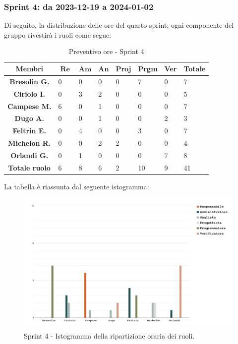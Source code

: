 \documentclass[10pt, a4paper]{article}
\begin{document}
{{{{{{{{{{{\subsubsection{Sprint 4: da 2023-12-19 a 2024-01-02}
Di seguito, la distribuzione delle ore del quarto sprint; ogni componente del gruppo rivestirà i ruoli come segue:
\begin{table}[H]
    \begin{tabularx}{\textwidth}{c|X|X|X|X|X|X|X}
        \textbf{Membri} & $\operatorname{\textbf{Re}}$ & $\mathrm{\textbf{Am}}$ & \textbf{An} & \textbf{Proj} & \textbf{Prgm} & \textbf{Ver} & \textbf{Totale} \\
        \hline
        \textbf{Bresolin G.} & 0 & 0 & 0 & 0 & \cellcolor{primarycolor}7 & 0 & 7 \\
        \hline
        \textbf{Ciriolo I.}  & 0 & 3 & \cellcolor{primarycolor}2 & 0 & 0 & 0 & 5 \\
        \hline
        \textbf{Campese M.}  & \cellcolor{primarycolor}6 & 0 & 1 & 0 & 0 & 0 & 7 \\
        \hline
        \textbf{Dugo A.}     & 0 & 0 &\cellcolor{primarycolor}1 & 0 & 0 & 2 & 3 \\
        \hline
        \textbf{Feltrin E.}  & 0 & \cellcolor{primarycolor}4 & 0 & 0 & 3 & 0 & 7 \\
        \hline
        \textbf{Michelon R.} & 0 & 0 & \cellcolor{primarycolor}2 & 2 & 0 & 0 & 4 \\
        \hline
        \textbf{Orlandi G.}  & 0 & 1 & 0 & 0 & 0 & \cellcolor{primarycolor}7 & 8 \\
        \hline
        \textbf{Totale ruolo} & 6 & 8 & 6 & 2 & 10 & 9 & 41 \\
    \end{tabularx}
    \caption{Preventivo ore - Sprint 4}
\end{table}

La tabella è riassunta dal seguente istogramma:
 \begin{figure}[H]
        \centering        
        \includegraphics[width=15.5cm]{istogrammi/istogramma_4_periodo.png}
        \caption{Sprint 4 - Istogramma della ripartizione oraria dei ruoli. }
    \end{figure}

}}}}}}}}}}}
\end{document}
